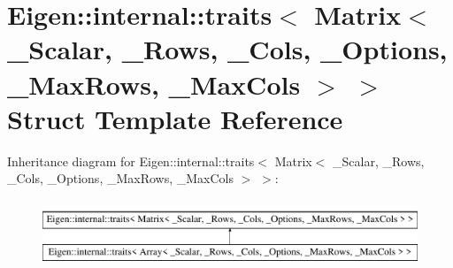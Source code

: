 \hypertarget{struct_eigen_1_1internal_1_1traits_3_01_matrix_3_01___scalar_00_01___rows_00_01___cols_00_01___o4c9772ffb3eee7280611af9a479b3583}{}\section{Eigen\+::internal\+::traits$<$ Matrix$<$ \+\_\+\+Scalar, \+\_\+\+Rows, \+\_\+\+Cols, \+\_\+\+Options, \+\_\+\+Max\+Rows, \+\_\+\+Max\+Cols $>$ $>$ Struct Template Reference}
\label{struct_eigen_1_1internal_1_1traits_3_01_matrix_3_01___scalar_00_01___rows_00_01___cols_00_01___o4c9772ffb3eee7280611af9a479b3583}
Inheritance diagram for Eigen\+::internal\+::traits$<$ Matrix$<$ \+\_\+\+Scalar, \+\_\+\+Rows, \+\_\+\+Cols, \+\_\+\+Options, \+\_\+\+Max\+Rows, \+\_\+\+Max\+Cols $>$ $>$\+:\begin{figure}[H]
\begin{center}
\leavevmode
\includegraphics[height=2.000000cm]{struct_eigen_1_1internal_1_1traits_3_01_matrix_3_01___scalar_00_01___rows_00_01___cols_00_01___o4c9772ffb3eee7280611af9a479b3583}
\end{center}
\end{figure}

